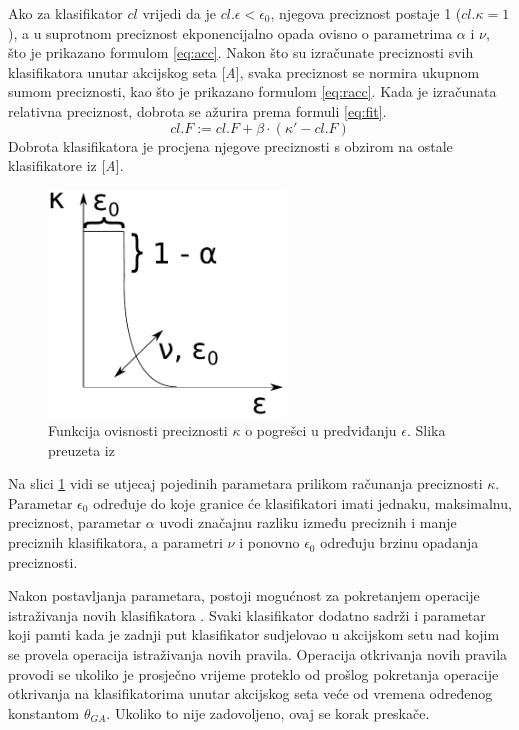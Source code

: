 \documentclass[times, utf8, zavrsni]{fer}
\begin{document}
Ako za klasifikator $cl$ vrijedi da je $cl.\epsilon < \epsilon_{0}$, njegova preciznost postaje 1 ($cl.\kappa = 1$), a u suprotnom preciznost ekponencijalno opada ovisno o parametrima $\alpha$ i $\nu$, što je prikazano formulom \eqref{eq:acc}.
Nakon što su izračunate preciznosti svih klasifikatora unutar akcijskog seta [\emph{A}], svaka preciznost se normira ukupnom sumom preciznosti, kao što je prikazano formulom \eqref{eq:racc}.
Kada je izračunata relativna preciznost, dobrota se ažurira prema formuli \eqref{eq:fit}.
\begin{equation}
    \label{eq:fit}
    cl.F := cl.F + \beta \cdot (\kappa' - cl.F)
\end{equation}
Dobrota klasifikatora je procjena njegove preciznosti s obzirom na ostale klasifikatore iz [\emph{A}].
\begin{figure}[h]
    \centering
    \includegraphics[height=6cm]{img/fit.pdf}
    \caption{Funkcija ovisnosti preciznosti $\kappa$ o pogrešci u predviđanju $\epsilon$. Slika preuzeta iz \citep{5}}
    \label{img:fit}
\end{figure}
Na slici \ref{img:fit} vidi se utjecaj pojedinih parametara prilikom računanja preciznosti $\kappa$.
Parametar $\epsilon_{0}$ određuje do koje granice će klasifikatori imati jednaku, maksimalnu, preciznost, parametar $\alpha$ uvodi značajnu razliku između preciznih i manje preciznih klasifikatora, a parametri $\nu$ i ponovno $\epsilon_{0}$ određuju brzinu opadanja preciznosti.

Nakon postavljanja parametara, postoji mogućnost za pokretanjem operacije istraživanja novih klasifikatora .
Svaki klasifikator dodatno sadrži i parametar koji pamti kada je zadnji put klasifikator sudjelovao u akcijskom setu nad kojim se provela operacija istraživanja novih pravila.
Operacija otkrivanja novih pravila provodi se ukoliko je prosječno vrijeme proteklo od prošlog pokretanja operacije otkrivanja na klasifikatorima unutar akcijskog seta veće od vremena određenog konstantom $\theta_{GA}$.
Ukoliko to nije zadovoljeno, ovaj se korak preskače.
\end{document}
